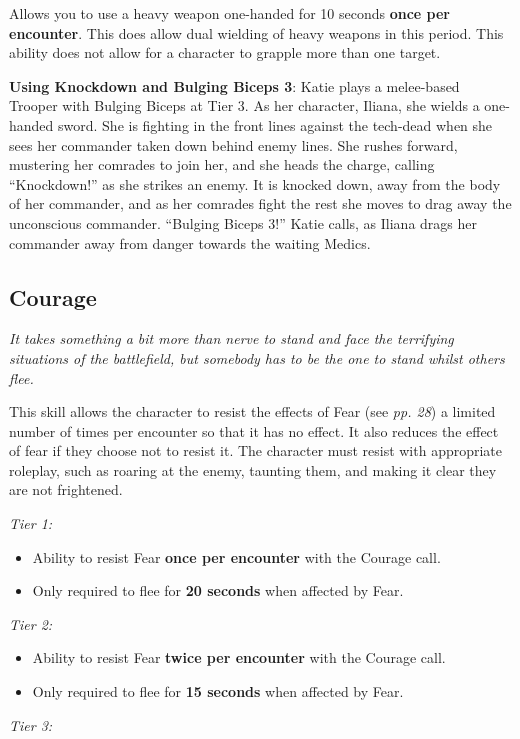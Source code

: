 Allows you to use a heavy weapon one-handed for 10 seconds \textbf{once per encounter}. This does allow dual wielding of heavy weapons in this period. This ability does not allow for a character to grapple more than one target.

\textbf{Using Knockdown and Bulging Biceps 3}: Katie plays a melee-based Trooper with Bulging Biceps at Tier 3. As her character, Iliana, she wields a one-handed sword. She is fighting in the front lines against the tech-dead when she sees her commander taken down behind enemy lines. She rushes forward, mustering her comrades to join her, and she heads the charge, calling ``Knockdown!'' as she strikes an enemy. It is knocked down, away from the body of her commander, and as her comrades fight the rest she moves to drag away the unconscious commander. ``Bulging Biceps 3!'' Katie calls, as Iliana drags her commander away from danger towards the waiting Medics.

\subsection{Courage}

\textit{It takes something a bit more than nerve to stand and face the terrifying situations of the battlefield, but somebody has to be the one to stand whilst others flee.}

This skill allows the character to resist the effects of Fear (see \textit{pp. 28}) a limited number of times per encounter so that it has no effect. It also reduces the effect of fear if they choose not to resist it. The character must resist with appropriate roleplay, such as roaring at the enemy, taunting them, and making it clear they are not frightened.

\textit{Tier 1:}

\begin{itemize}
\item Ability to resist Fear \textbf{once per encounter} with the Courage call.

\item Only required to flee for \textbf{20 seconds} when affected by Fear.

\end{itemize}
\textit{Tier 2:}

\begin{itemize}
\item Ability to resist Fear \textbf{twice per encounter} with the Courage call.

\item Only required to flee for \textbf{15 seconds} when affected by Fear.

\end{itemize}
\textit{Tier 3:}

